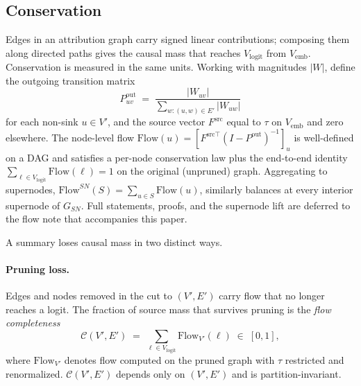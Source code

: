 \subsection{Conservation}\label{sec:attr-cons}

Edges in an attribution graph carry signed linear contributions;
composing them along directed paths gives the causal mass that reaches
$V_{\text{logit}}$ from $V_{\text{emb}}$. Conservation is measured in
the same units. Working with magnitudes $|W|$, define the outgoing
transition matrix
\begin{equation}
P^{\text{out}}_{uv}
\;=\;
\frac{|W_{uv}|}{\sum_{w : (u, w) \in E'} |W_{uw}|}
\label{eq:Pout-reform}
\end{equation}
for each non-sink $u \in V'$, and the source vector $F^{\text{src}}$
equal to $\tau$ on $V_{\text{emb}}$ and zero elsewhere. The node-level
flow $\mathrm{Flow}(u) = [F^{\text{src}\top}(I - P^{\text{out}})^{-1}]_u$
is well-defined on a DAG and satisfies a per-node conservation law plus
the end-to-end identity $\sum_{\ell \in V_{\text{logit}}} \mathrm{Flow}(\ell)
= 1$ on the original (unpruned) graph. Aggregating to supernodes,
$\mathrm{Flow}^{SN}(S) = \sum_{u \in S} \mathrm{Flow}(u)$, similarly
balances at every interior supernode of $G_{SN}$. Full statements,
proofs, and the supernode lift are deferred to the flow note that
accompanies this paper.

A summary loses causal mass in two distinct ways.

\paragraph{Pruning loss.}
Edges and nodes removed in the cut to $(V', E')$ carry flow that no
longer reaches a logit. The fraction of source mass that survives
pruning is the \emph{flow completeness}
\begin{equation}
\mathcal{C}(V', E')
\;=\;
\sum_{\ell \in V_{\text{logit}}} \mathrm{Flow}_{V'}(\ell)
\;\in\; [0, 1],
\label{eq:Ccal}
\end{equation}
where $\mathrm{Flow}_{V'}$ denotes flow computed on the pruned graph
with $\tau$ restricted and renormalized. $\mathcal{C}(V', E')$ depends
only on $(V', E')$ and is partition-invariant.


